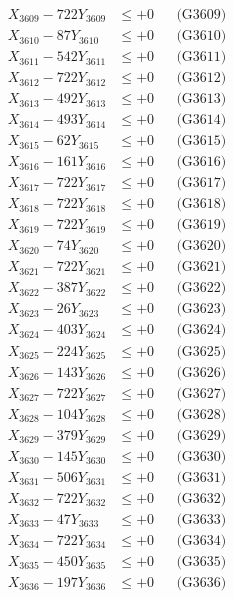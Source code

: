 \documentclass[a4paper,10pt]{article}
\begin{document}
{\begin{align}
X_{3609} - 722Y_{3609} &\leq +0 && \text{(G3609)} \\
X_{3610} - 87Y_{3610} &\leq +0 && \text{(G3610)} \\
\allowbreak
X_{3611} - 542Y_{3611} &\leq +0 && \text{(G3611)} \\
X_{3612} - 722Y_{3612} &\leq +0 && \text{(G3612)} \\
X_{3613} - 492Y_{3613} &\leq +0 && \text{(G3613)} \\
X_{3614} - 493Y_{3614} &\leq +0 && \text{(G3614)} \\
X_{3615} - 62Y_{3615} &\leq +0 && \text{(G3615)} \\
X_{3616} - 161Y_{3616} &\leq +0 && \text{(G3616)} \\
X_{3617} - 722Y_{3617} &\leq +0 && \text{(G3617)} \\
X_{3618} - 722Y_{3618} &\leq +0 && \text{(G3618)} \\
X_{3619} - 722Y_{3619} &\leq +0 && \text{(G3619)} \\
X_{3620} - 74Y_{3620} &\leq +0 && \text{(G3620)} \\
\allowbreak
X_{3621} - 722Y_{3621} &\leq +0 && \text{(G3621)} \\
X_{3622} - 387Y_{3622} &\leq +0 && \text{(G3622)} \\
X_{3623} - 26Y_{3623} &\leq +0 && \text{(G3623)} \\
X_{3624} - 403Y_{3624} &\leq +0 && \text{(G3624)} \\
X_{3625} - 224Y_{3625} &\leq +0 && \text{(G3625)} \\
X_{3626} - 143Y_{3626} &\leq +0 && \text{(G3626)} \\
X_{3627} - 722Y_{3627} &\leq +0 && \text{(G3627)} \\
X_{3628} - 104Y_{3628} &\leq +0 && \text{(G3628)} \\
X_{3629} - 379Y_{3629} &\leq +0 && \text{(G3629)} \\
X_{3630} - 145Y_{3630} &\leq +0 && \text{(G3630)} \\
\allowbreak
X_{3631} - 506Y_{3631} &\leq +0 && \text{(G3631)} \\
X_{3632} - 722Y_{3632} &\leq +0 && \text{(G3632)} \\
X_{3633} - 47Y_{3633} &\leq +0 && \text{(G3633)} \\
X_{3634} - 722Y_{3634} &\leq +0 && \text{(G3634)} \\
X_{3635} - 450Y_{3635} &\leq +0 && \text{(G3635)} \\
X_{3636} - 197Y_{3636} &\leq +0 && \text{(G3636)} \\

\end{align}}
\end{document}
